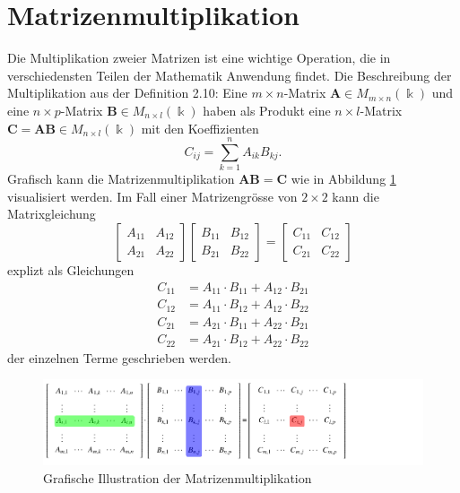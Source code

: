 %
%
%
\section{Matrizenmultiplikation \label{multiplikation:section:einleitung}}

Die Multiplikation zweier Matrizen ist eine wichtige Operation, die in verschiedensten Teilen der Mathematik Anwendung findet.
Die Beschreibung der Multiplikation aus der Definition 2.10:
Eine $m\times n$-Matrix $\mathbf{A}\in M_{m\times n}(\Bbbk)$ und eine
$n\times p$-Matrix $\mathbf{B}\in M_{n\times l}(\Bbbk)$ haben als Produkt
eine $n\times l$-Matrix $\mathbf{C}=\mathbf{AB}\in M_{n\times l}(\Bbbk)$ mit den
Koeffizienten
\begin{equation}
C_{ij} = \sum_{k=1}^n A_{ik} B_{kj}.
\label{multiplikation:eq:MM}
\end{equation}
Grafisch kann die Matrizenmultiplikation $\mathbf{AB}=\mathbf{C}$ wie in Abbildung \ref{multiplikation:fig:mm_viz} visualisiert werden.
Im Fall einer Matrizengr\"osse von $2\times 2$ kann die Matrixgleichung
\begin{equation}
  \begin{bmatrix}
A_{11} & A_{12}\\
A_{21} & A_{22}
\end{bmatrix}
\begin{bmatrix}
B_{11} & B_{12}\\
B_{21} & B_{22}
\end{bmatrix}
=
\begin{bmatrix}
C_{11} & C_{12}\\
C_{21} & C_{22}
\end{bmatrix}
\end{equation}
explizt als Gleichungen
\begin{equation} \label{multiplikation:eq:MM_exp}
\begin{split}
C_{11} &= A_{11} \cdot B_{11} + A_{12} \cdot B_{21}\\
C_{12} &= A_{11} \cdot B_{12} + A_{12} \cdot B_{22}\\
C_{21} &= A_{21} \cdot B_{11} + A_{22} \cdot B_{21}\\
C_{22} &= A_{21} \cdot B_{12} + A_{22} \cdot B_{22}
\end{split}
\end{equation}
der einzelnen Terme geschrieben werden.
\begin{figure}
	\center
	\includegraphics[]{papers/multiplikation/images/mm_visualisation}
	\caption{Grafische Illustration der Matrizenmultiplikation}
	\label{multiplikation:fig:mm_viz}
\end{figure}
